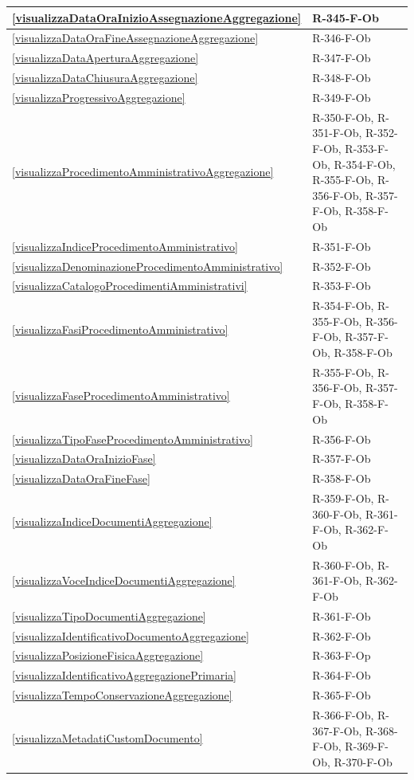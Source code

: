 \begin{longtable}{|p{4cm}|p{10cm}|}
\hline
\ref{visualizzaDataOraInizioAssegnazioneAggregazione} & R-345-F-Ob \\
\hline
\ref{visualizzaDataOraFineAssegnazioneAggregazione} & R-346-F-Ob \\
\hline
\ref{visualizzaDataAperturaAggregazione} & R-347-F-Ob \\
\hline
\ref{visualizzaDataChiusuraAggregazione} & R-348-F-Ob \\
\hline
\ref{visualizzaProgressivoAggregazione} & R-349-F-Ob \\
\hline
\ref{visualizzaProcedimentoAmministrativoAggregazione} & R-350-F-Ob, R-351-F-Ob, R-352-F-Ob, R-353-F-Ob, R-354-F-Ob, R-355-F-Ob, R-356-F-Ob, R-357-F-Ob, R-358-F-Ob \\
\hline
\ref{visualizzaIndiceProcedimentoAmministrativo} & R-351-F-Ob \\
\hline
\ref{visualizzaDenominazioneProcedimentoAmministrativo} & R-352-F-Ob \\
\hline
\ref{visualizzaCatalogoProcedimentiAmministrativi} & R-353-F-Ob \\
\hline
\ref{visualizzaFasiProcedimentoAmministrativo} & R-354-F-Ob, R-355-F-Ob, R-356-F-Ob, R-357-F-Ob, R-358-F-Ob \\
\hline
\ref{visualizzaFaseProcedimentoAmministrativo} & R-355-F-Ob, R-356-F-Ob, R-357-F-Ob, R-358-F-Ob \\
\hline
\ref{visualizzaTipoFaseProcedimentoAmministrativo} & R-356-F-Ob \\
\hline
\ref{visualizzaDataOraInizioFase} & R-357-F-Ob \\
\hline
\ref{visualizzaDataOraFineFase} & R-358-F-Ob \\
\hline
\ref{visualizzaIndiceDocumentiAggregazione} & R-359-F-Ob, R-360-F-Ob, R-361-F-Ob, R-362-F-Ob \\
\hline
\ref{visualizzaVoceIndiceDocumentiAggregazione} & R-360-F-Ob, R-361-F-Ob, R-362-F-Ob \\
\hline
\ref{visualizzaTipoDocumentiAggregazione} & R-361-F-Ob \\
\hline
\ref{visualizzaIdentificativoDocumentoAggregazione} & R-362-F-Ob \\
\hline
\ref{visualizzaPosizioneFisicaAggregazione} & R-363-F-Op \\
\hline
\ref{visualizzaIdentificativoAggregazionePrimaria} & R-364-F-Ob \\
\hline
\ref{visualizzaTempoConservazioneAggregazione} & R-365-F-Ob \\
\hline
\ref{visualizzaMetadatiCustomDocumento} & R-366-F-Ob, R-367-F-Ob, R-368-F-Ob, R-369-F-Ob, R-370-F-Ob \\

\end{longtable}
